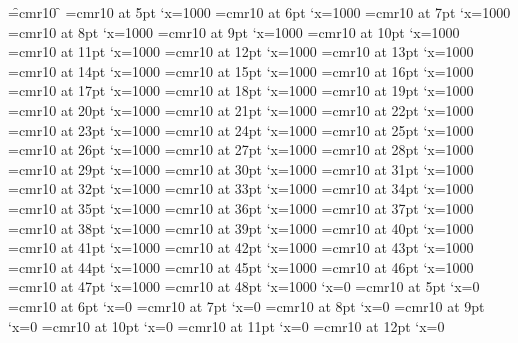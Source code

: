 
\font\f=cmr10 \f
{}\nullfont=5pt
\font\FAA=cmr10 at 5pt \efcode\FAA`x=1000
\font\FAB=cmr10 at 6pt \efcode\FAB`x=1000
\font\FAC=cmr10 at 7pt \efcode\FAC`x=1000
\font\FAD=cmr10 at 8pt \efcode\FAD`x=1000
\font\FAE=cmr10 at 9pt \efcode\FAE`x=1000
\font\FAF=cmr10 at 10pt \efcode\FAF`x=1000
\font\FAG=cmr10 at 11pt \efcode\FAG`x=1000
\font\FAH=cmr10 at 12pt \efcode\FAH`x=1000
\font\FAI=cmr10 at 13pt \efcode\FAI`x=1000
\font\FAJ=cmr10 at 14pt \efcode\FAJ`x=1000
\font\FAK=cmr10 at 15pt \efcode\FAK`x=1000
\font\FAL=cmr10 at 16pt \efcode\FAL`x=1000
\font\FAM=cmr10 at 17pt \efcode\FAM`x=1000
\font\FAN=cmr10 at 18pt \efcode\FAN`x=1000
\font\FAO=cmr10 at 19pt \efcode\FAO`x=1000
\font\FAP=cmr10 at 20pt \efcode\FAP`x=1000
\font\FAQ=cmr10 at 21pt \efcode\FAQ`x=1000
\font\FAR=cmr10 at 22pt \efcode\FAR`x=1000
\font\FAS=cmr10 at 23pt \efcode\FAS`x=1000
\font\FAT=cmr10 at 24pt \efcode\FAT`x=1000
\font\FAU=cmr10 at 25pt \efcode\FAU`x=1000
\font\FAV=cmr10 at 26pt \efcode\FAV`x=1000
\font\FAW=cmr10 at 27pt \efcode\FAW`x=1000
\font\FAX=cmr10 at 28pt \efcode\FAX`x=1000
\font\FAY=cmr10 at 29pt \efcode\FAY`x=1000
\font\FAZ=cmr10 at 30pt \efcode\FAZ`x=1000
\font\FBA=cmr10 at 31pt \efcode\FBA`x=1000
\font\FBB=cmr10 at 32pt \efcode\FBB`x=1000
\font\FBC=cmr10 at 33pt \efcode\FBC`x=1000
\font\FBD=cmr10 at 34pt \efcode\FBD`x=1000
\font\FBE=cmr10 at 35pt \efcode\FBE`x=1000
\font\FBF=cmr10 at 36pt \efcode\FBF`x=1000
\font\FBG=cmr10 at 37pt \efcode\FBG`x=1000
\font\FBH=cmr10 at 38pt \efcode\FBH`x=1000
\font\FBI=cmr10 at 39pt \efcode\FBI`x=1000
\font\FBJ=cmr10 at 40pt \efcode\FBJ`x=1000
\font\FBK=cmr10 at 41pt \efcode\FBK`x=1000
\font\FBL=cmr10 at 42pt \efcode\FBL`x=1000
\font\FBM=cmr10 at 43pt \efcode\FBM`x=1000
\font\FBN=cmr10 at 44pt \efcode\FBN`x=1000
\font\FBO=cmr10 at 45pt \efcode\FBO`x=1000
\font\FBP=cmr10 at 46pt \efcode\FBP`x=1000
\font\FBQ=cmr10 at 47pt \efcode\FBQ`x=1000
\font\FBR=cmr10 at 48pt \efcode\FBR`x=1000
\knbscode\nullfont`x=0
\font\F=cmr10 at 5pt \lpcode\F`x=0
\font\F=cmr10 at 6pt \lpcode\F`x=0
\font\F=cmr10 at 7pt \lpcode\F`x=0
\font\F=cmr10 at 8pt \lpcode\F`x=0
\font\F=cmr10 at 9pt \lpcode\F`x=0
\font\F=cmr10 at 10pt \lpcode\F`x=0
\font\F=cmr10 at 11pt \lpcode\F`x=0
\font\F=cmr10 at 12pt \lpcode\F`x=0
